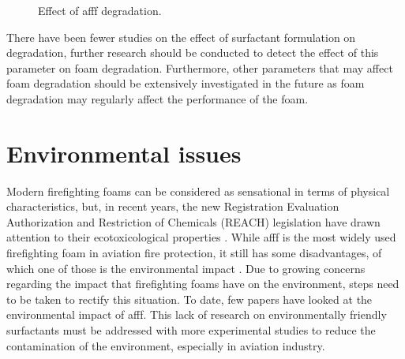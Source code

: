 \begin{figure}[H]

\centering
\begin{adjustbox}{center}
\end{adjustbox}

\caption{Effect of \acrshort{afff} degradation.}
\label{ch2:figure:effect}
\end{figure}

There have been fewer studies on the effect of surfactant formulation on degradation, further research should be conducted to detect the effect of this parameter on foam degradation. Furthermore, other parameters that may affect foam degradation should be extensively investigated in the future as foam degradation may regularly affect the performance of the foam.

\section{Environmental issues}
Modern firefighting foams can be considered as sensational in terms of physical characteristics, but, in recent years, the new Registration Evaluation Authorization and Restriction of Chemicals (REACH) legislation have drawn attention to their ecotoxicological properties \cite{turekova2011environmental}. While \acrshort{afff} is the most widely used firefighting foam in aviation fire protection, it still has some disadvantages, of which one of those is the environmental impact \cite{zhao2016improving}. Due to growing concerns regarding the impact that firefighting foams have on the environment, steps need to be taken to rectify this situation. To date, few papers have looked at the environmental impact of \acrshort{afff}. This lack of research on environmentally friendly surfactants must be addressed with more experimental studies to reduce the contamination of the environment, especially in aviation industry.

